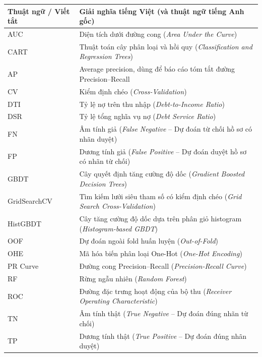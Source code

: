 \documentclass[12pt,a4paper,oneside]{report}
\renewcommand{\arraystretch}{1.2}
\begin{document}
\begingroup\small{}\renewcommand{\arraystretch}{1.2}\setlength{\extrarowheight}{1.5pt}\noindent
  \begin{tabularx}{\textwidth}{|l|X|}
    \hline
    \textbf{Thuật ngữ / Viết tắt} & \textbf{Giải nghĩa tiếng Việt (và thuật ngữ tiếng Anh gốc)} \\
    \hline
    AUC & Diện tích dưới đường cong (\textit{Area Under the Curve}) \\ \hline
    CART & Thuật toán cây phân loại và hồi quy (\textit{Classification and Regression Trees}) \\ \hline
    AP & Average precision, dùng để báo cáo tóm tắt đường Precision--Recall \\ \hline
    CV & Kiểm định chéo (\textit{Cross-Validation}) \\ \hline
    DTI & Tỷ lệ nợ trên thu nhập (\textit{Debt-to-Income Ratio}) \\ \hline
    DSR & Tỷ lệ tổng nghĩa vụ nợ (\textit{Debt Service Ratio}) \\ \hline
    FN & Âm tính giả (\textit{False Negative} -- Dự đoán từ chối hồ sơ có nhãn duyệt) \\ \hline
    FP & Dương tính giả (\textit{False Positive} -- Dự đoán duyệt hồ sơ có nhãn từ chối) \\ \hline
    GBDT & Cây quyết định tăng cường độ dốc (\textit{Gradient Boosted Decision Trees}) \\ \hline
    GridSearchCV & Tìm kiếm lưới siêu tham số có kiểm định chéo (\textit{Grid Search Cross-Validation}) \\ \hline
    HistGBDT & Cây tăng cường độ dốc dựa trên phân giỏ histogram (\textit{Histogram-based GBDT}) \\ \hline
    OOF & Dự đoán ngoài fold huấn luyện (\textit{Out-of-Fold}) \\ \hline
    OHE & Mã hóa biến phân loại One-Hot (\textit{One-Hot Encoding}) \\ \hline
    PR Curve & Đường cong Precision--Recall (\textit{Precision-Recall Curve}) \\ \hline
    RF & Rừng ngẫu nhiên (\textit{Random Forest}) \\ \hline
    ROC & Đường đặc trưng hoạt động của bộ thu (\textit{Receiver Operating Characteristic}) \\ \hline
    TN & Âm tính thật (\textit{True Negative} -- Dự đoán đúng nhãn từ chối) \\ \hline
    TP & Dương tính thật (\textit{True Positive} -- Dự đoán đúng nhãn duyệt) \\ \hline
  \end{tabularx}
\par\endgroup
\end{document}
